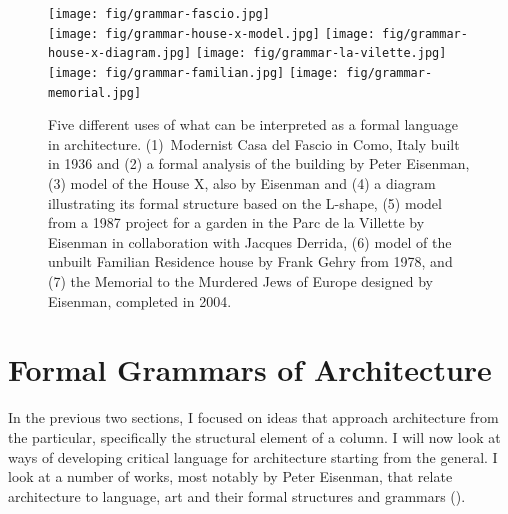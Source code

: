 \begin{figure}[t]
\vspace{-1em}
\texttt{[image: fig/grammar-fascio.jpg]}\quad
{}\\[1em]
\texttt{[image: fig/grammar-house-x-model.jpg]}\quad
\texttt{[image: fig/grammar-house-x-diagram.jpg]}\quad
\texttt{[image: fig/grammar-la-vilette.jpg]}\\[1em]
\texttt{[image: fig/grammar-familian.jpg]}\quad
\texttt{[image: fig/grammar-memorial.jpg]}
\caption{Five different uses of what can be interpreted as a formal language in architecture.
(1)~Modernist Casa del Fascio in Como, Italy built in 1936 and (2) a formal analysis of the building
by Peter Eisenman, (3) model of the House X, also by Eisenman and (4) a diagram illustrating
its formal structure based on the L-shape, (5) model from a 1987 project for a garden in the
Parc de la Villette by Eisenman in collaboration with Jacques Derrida, (6) model of the unbuilt
Familian Residence house by Frank Gehry from 1978, and (7) the Memorial to the Murdered Jews of
Europe designed by Eisenman, completed in 2004.}
\label{fig:grammar}
\vspace{-0.5em}
\end{figure}

\section{Formal Grammars of Architecture}

In the previous two sections, I focused on ideas that approach architecture from
the particular, specifically the structural element of a column. I will now look at ways
of developing critical language for architecture starting from the general.
I look at a number of works, most notably by Peter Eisenman, that relate architecture to
language, art and their formal structures and grammars ().

